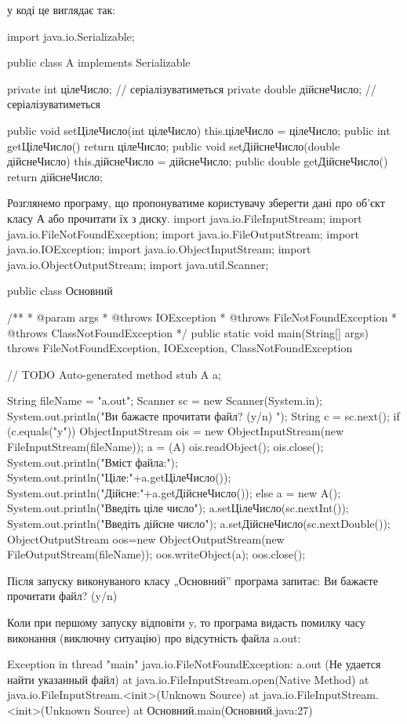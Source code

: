 у коді це виглядає так:

import java.io.Serializable;

public class A implements Serializable{
	private int цілеЧисло; // серіалізуватиметься
	private double дійснеЧисло; // серіалізуватиметься
	
	public void setЦілеЧисло(int цілеЧисло) {
		this.цілеЧисло = цілеЧисло;
	}
	public int getЦілеЧисло() {
		return цілеЧисло;
	}
	public void setДійснеЧисло(double дійснеЧисло) {
		this.дійснеЧисло = дійснеЧисло;
	}
	public double getДійснеЧисло() {
		return дійснеЧисло;
	}

}

Розглянемо програму, що пропонуватиме користувачу зберегти дані про об’єкт класу А або прочитати їх з диску.
import java.io.FileInputStream;
import java.io.FileNotFoundException;
import java.io.FileOutputStream;
import java.io.IOException;
import java.io.ObjectInputStream;
import java.io.ObjectOutputStream;
import java.util.Scanner;


public class Основний {

	/**
	 * @param args
	 * @throws IOException
	 * @throws FileNotFoundException
	 * @throws ClassNotFoundException
	 */
	public static void main(String[] args) throws FileNotFoundException, IOException, ClassNotFoundException {
		// TODO Auto-generated method stub
		A a;

		String fileName = "a.out";
		Scanner sc = new Scanner(System.in);
		System.out.println("Ви бажаєте прочитати файл? (y/n) ");
		String c = sc.next();
		if (c.equals("y")){
			ObjectInputStream ois = new ObjectInputStream(new FileInputStream(fileName));
			a =  (A) ois.readObject();
			ois.close();
			System.out.println("Вміст файла:");
			System.out.println("Ціле:"+a.getЦілеЧисло());
			System.out.println("Дійсне:"+a.getДійснеЧисло());
		}
		else{
			a = new A();
			System.out.println("Введіть ціле число");
			a.setЦілеЧисло(sc.nextInt());
			System.out.println("Введіть дійсне число");
			a.setДійснеЧисло(sc.nextDouble());
			ObjectOutputStream oos=new ObjectOutputStream(new FileOutputStream(fileName));
			oos.writeObject(a);
			oos.close();
		}
	}

}

Після запуску виконуваного класу „Основний” програма запитає:
Ви бажаєте прочитати файл? (y/n) 

Коли при першому запуску відповіти y, то програма видасть помилку часу виконання (виключну ситуацію) про відсутність файла a.out:

Exception in thread "main" java.io.FileNotFoundException: a.out (Не удается найти указанный файл)
	at java.io.FileInputStream.open(Native Method)
	at java.io.FileInputStream.<init>(Unknown Source)
	at java.io.FileInputStream.<init>(Unknown Source)
	at Основний.main(Основний.java:27)

